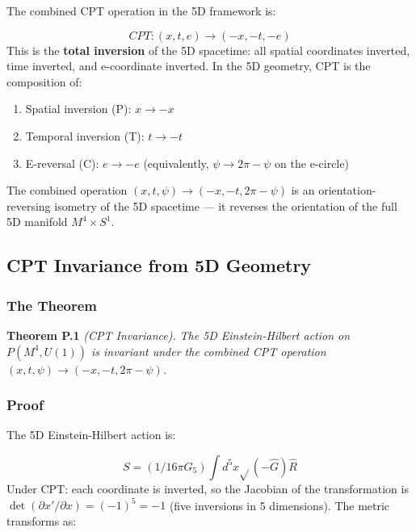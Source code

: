 \documentclass[aps,prd,preprint,superscriptaddress,longbibliography,floatfix]{revtex4-2}
\theoremstyle{remark}
\begin{document}
The combined CPT operation in the 5D framework is:


\begin{equation}
    CPT: (x, t, e) \to (-x, -t, -e)
\end{equation}
This is the \textbf{total inversion} of the 5D spacetime: all spatial coordinates inverted, time inverted, and e-coordinate inverted. In the 5D geometry, CPT is the composition of:


\begin{enumerate}
  \item Spatial inversion (P): $x \to -x$
  \item Temporal inversion (T): $t \to -t$
  \item E-reversal (C): $e \to -e$ (equivalently, $\psi \to 2\pi - \psi$ on the e-circle)
\end{enumerate}

The combined operation $(x, t, \psi) \to (-x, -t, 2\pi - \psi)$ is an orientation- reversing isometry of the 5D spacetime --- it reverses the orientation of the full 5D manifold $M^{4} \times S^{1}$.



\subsection{CPT Invariance from 5D Geometry}


\subsubsection{The Theorem}

\textbf{Theorem P.1} \textit{(CPT Invariance).} \textit{The 5D Einstein-Hilbert action on $P(M^{4}, U(1))$ is invariant under the combined CPT operation $(x, t, \psi) \to (-x, -t, 2\pi - \psi)$.}


\subsubsection{Proof}

The 5D Einstein-Hilbert action is:


\begin{equation}
    S = (1/16\pi G_{5}) \int d^{5}x \sqrt{}(-\hat{G}) \hat{R}
\end{equation}
Under CPT: each coordinate is inverted, so the Jacobian of the transformation is $\det(\partial x'/\partial x) = (-1)^{5} = -1$ (five inversions in 5 dimensions). The metric transforms as:
\end{document}
